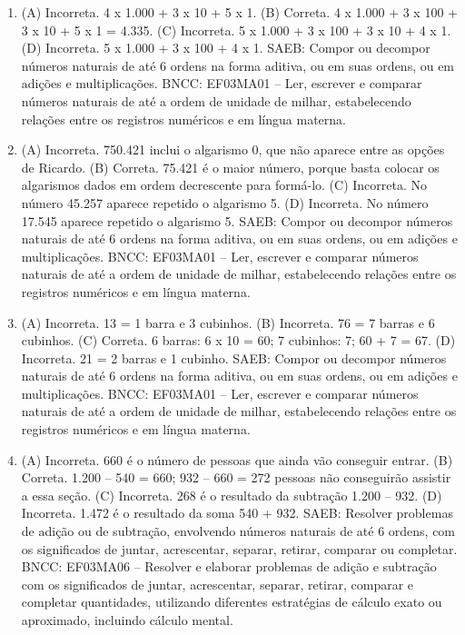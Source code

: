 
\begin{enumerate}
\item
(A) Incorreta. 4 x 1.000 + 3 x 10 + 5 x 1.
(B) Correta. 4 x 1.000 + 3 x 100 + 3 x 10 + 5 x 1 = 4.335.
(C) Incorreta. 5 x 1.000 + 3 x 100 + 3 x 10 + 4 x 1.
(D) Incorreta. 5 x 1.000 + 3 x 100 + 4 x 1.
SAEB: Compor ou decompor números naturais de até 6 ordens na forma aditiva, ou em suas ordens, ou em adições e multiplicações.
BNCC: EF03MA01 -- Ler, escrever e comparar números naturais de até a ordem de unidade de milhar, estabelecendo relações entre os registros numéricos e em língua materna.

\item
(A) Incorreta. 750.421 inclui o algarismo 0, que não aparece entre as opções de Ricardo.
(B) Correta. 75.421 é o maior número, porque basta colocar os algarismos dados em ordem decrescente para formá-lo.
(C) Incorreta. No número 45.257 aparece repetido o algarismo 5. 
(D) Incorreta. No número 17.545 aparece repetido o algarismo 5. 
SAEB: Compor ou decompor números naturais de até 6 ordens na forma aditiva, ou em suas ordens, ou em adições e multiplicações.
BNCC: EF03MA01 -- Ler, escrever e comparar números naturais de até a ordem de unidade de milhar, estabelecendo relações entre os registros numéricos e em língua materna.

\item
(A) Incorreta. 13 = 1 barra e 3 cubinhos.
(B) Incorreta. 76 = 7 barras e 6 cubinhos.
(C) Correta. 6 barras: 6 x 10 = 60; 7 cubinhos: 7; 60 + 7 = 67.
(D) Incorreta. 21 = 2 barras e 1 cubinho.
SAEB: Compor ou decompor números naturais de até 6 ordens na forma aditiva, ou em suas ordens, ou em adições e multiplicações.
BNCC: EF03MA01 -- Ler, escrever e comparar números naturais de até a ordem de unidade de milhar, estabelecendo relações entre os registros numéricos e em língua materna.

\item
(A) Incorreta. 660 é o número de pessoas que ainda vão conseguir entrar.
(B) Correta. 1.200 -- 540 = 660; 932 -- 660 = 272 pessoas não conseguirão assistir a essa seção.
(C) Incorreta. 268 é o resultado da subtração 1.200 -- 932.
(D) Incorreta. 1.472 é o resultado da soma 540 + 932.
SAEB: Resolver problemas de adição ou de subtração,
envolvendo números naturais de até 6 ordens, com os significados de
juntar, acrescentar, separar, retirar, comparar ou completar.
BNCC: EF03MA06 – Resolver e elaborar problemas de adição e subtração com os significados de
juntar, acrescentar, separar, retirar, comparar e completar quantidades, utilizando diferentes
estratégias de cálculo exato ou aproximado, incluindo cálculo mental.


\end{enumerate}
